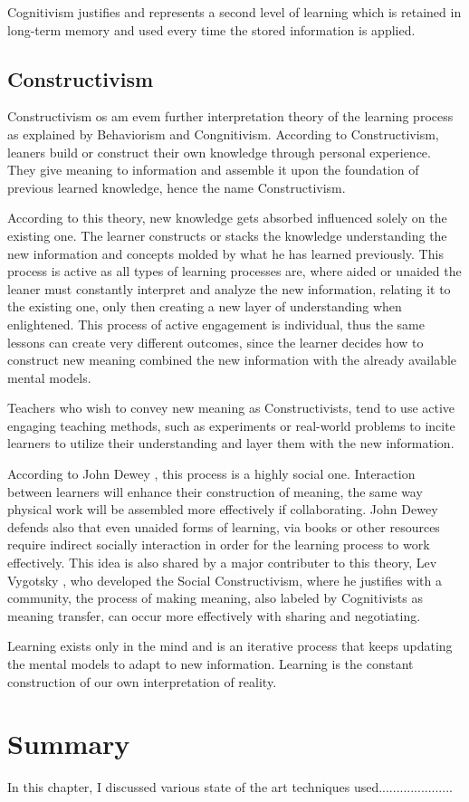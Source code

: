 Cognitivism justifies and represents a second level of learning which is retained
in long-term memory and used every time the stored information is applied.




\subsection{Constructivism}

Constructivism os am evem further interpretation theory of the learning process 
as explained by Behaviorism and Congnitivism. According to Constructivism, leaners
build or construct their own knowledge through personal experience. They give meaning
to information and assemble it upon the foundation of previous learned knowledge, 
hence the name Constructivism.

According to this theory, new knowledge gets absorbed influenced solely on the 
existing one. The learner constructs or stacks the knowledge understanding the new 
information and concepts molded by what he has learned previously. This process is
active \cite{adler_1970} as all types of learning processes are, where aided or 
unaided the leaner must constantly interpret and analyze the new information,
relating it to the existing one, only then creating a new layer of understanding 
when enlightened. This process of active engagement is individual, thus the same 
lessons can create very different outcomes, since the learner decides how to construct
new meaning combined the new information with the already available mental models.

Teachers who wish to convey new meaning as Constructivists, tend to use active 
engaging teaching methods, such as experiments or real-world problems to incite
learners to utilize their understanding and layer them with the new information.

According to John Dewey \cite{dewey_1938}, this process is a highly social one. 
Interaction between learners will enhance their construction of meaning, the same
way physical work will be assembled more effectively if collaborating.
John Dewey defends also that even unaided forms of learning, via books or other 
resources require indirect socially interaction in order for the learning process 
to work effectively. This idea is also shared by a major contributer to this theory,
Lev Vygotsky \cite{vygotsky_1978}, who developed the Social Constructivism, where 
he justifies with a community, the process of making meaning, also labeled by
Cognitivists as meaning transfer, can occur more effectively with sharing and 
negotiating.

Learning exists only in the mind and is an iterative process that keeps updating the
mental models to adapt to new information. Learning is the constant construction 
of our own interpretation of reality.



\section{Summary}

In this chapter, I discussed various state of the art techniques used.....................
